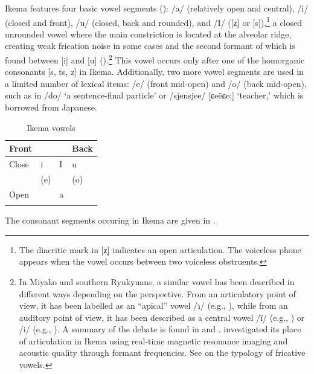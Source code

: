 \documentclass[output=paper]{langscibook}
\begin{document}
Ikema features four basic vowel segments (): /a/ (relatively open and central), /i/ (closed and front), /u/ (closed, back and rounded), and /I/ ([z̞] or [s]),\footnote{The diacritic mark in [z̞] indicates an open articulation. The voiceless phone appears when the vowel occurs between two voiceless obstruents.} a closed unrounded vowel where the main constriction is located at the alveolar ridge, creating weak frication noise in some cases and the second formant of which is found between [i] and [u] (\citealt{FujimotoShinohara2018}).\footnote{ In Miyako and southern Ryukyuans, a similar vowel has been described in different ways depending on the perspective. From an articulatory point of view, it has been labelled as an “apical” vowel /ɿ/ (e.g., \citealt{Sakiyama1963}), while from an auditory point of view, it has been described as a central vowel /ï/ (e.g., \citealt{Uchima1984}) or /i/ (e.g., \citealt{Hayashi2010}). A summary of the debate is found in \citet{OonoEtAl2000} and \citet{PellardHayashi2012}. \citet{FujimotoShinohara2018} investigated its place of articulation in Ikema using real-time magnetic resonance imaging and acoustic quality through formant frequencies. See  on the typology of fricative vowels.} This vowel occurs only after one of the homorganic consonants [s, ts, z] in Ikema. Additionally, two more vowel segments are used in a limited number of lexical items: /e/ (front mid-open) and /o/ (back mid-open), such as in /do/ ‘a sentence-final particle’ or /sjensjee/ [ɕeẽɕe:] ‘teacher,’ which is borrowed from Japanese.

\begin{table}
\begin{tabular}{llll}
\lsptoprule
Front  &     &   &   Back\\\midrule
Close  &   i & I & u   \\
       & (e) &   & (o) \\
Open   &     & a &     \\
\lspbottomrule
\end{tabular}
\caption{Ikema vowels}
\label{tab:shinohara:1}
\end{table}

The consonant segments occuring in Ikema are given in .
\end{document}
